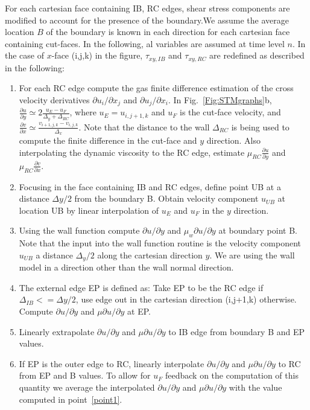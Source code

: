 For each cartesian face containing IB, RC edges, shear stress components are modified to account for the presence of the boundary.We assume the average location $B$ of the boundary is known in each direction for each cartesian face containing cut-faces. In the following, al variables are assumed at time level $n$. In the case of $x$-face (i,j,k) in the figure, $\tau_{xy,IB}$ and $\tau_{xy,RC}$ are redefined as described in the following:
%
\begin{enumerate}
    \item For each RC edge compute the gas finite difference estimation of the cross velocity derivatives $\partial u_i/\partial x_j$ and $\partial u_j/\partial x_i$. In Fig.~\ref{Fig:STMgraphs}b, $\frac{\partial u}{\partial y} \simeq 2 \frac{u_E-u_F}{\Delta_y + \Delta_{RC}}$, where $u_E=u_{i,j+1,k}$ and $u_F$ is the cut-face velocity, and $\frac{\partial v}{\partial x} \simeq \frac{v_{i+1,j,k}-v_{i,j,k}}{\Delta_x}$. Note that the distance to the wall $\Delta_{RC}$ is being used to compute the finite difference in the cut-face and $y$ direction. Also interpolating the dynamic viscosity to the RC edge, estimate $\mu_{RC} \frac{\partial u}{\partial y}$ and $\mu_{RC} \frac{\partial v}{\partial x}$. \label{point1}
     \item Focusing in the face containing IB and RC edges, define point UB at a distance $\Delta y/2$ from the boundary B. Obtain velocity component $u_{UB}$ at location UB by linear interpolation of $u_E$ and $u_F$ in the $y$ direction.
     \item Using the wall function compute $\partial u/\partial y$ and $\mu_w \partial u/\partial y$ at boundary point B. Note that the input into the wall function routine is the velocity component $u_{UB}$ a distance $\Delta_y/2$ along the cartesian direction $y$. We are using the wall model in a direction other than the wall normal direction. 
     \item The external edge EP is defined as: Take EP to be the RC edge if $\Delta_{IB} <= \Delta y/2$, use edge out in the cartesian direction (i,j+1,k) otherwise. Compute $\partial u/\partial y$ and $\mu \partial u/\partial y$ at EP.
     \item Linearly extrapolate $\partial u/\partial y$ and $\mu \partial u/\partial y$ to IB edge from boundary B and EP values.
     \item If EP is the outer edge to RC, linearly interpolate $\partial u/\partial y$ and $\mu \partial u/\partial y$ to RC from EP and B values. To allow for $u_F$ feedback on the computation of this quantity we average the interpolated $\partial u/\partial y$ and $\mu \partial u/\partial y$ with the value computed in point~\ref{point1}.
\end{enumerate}
%

